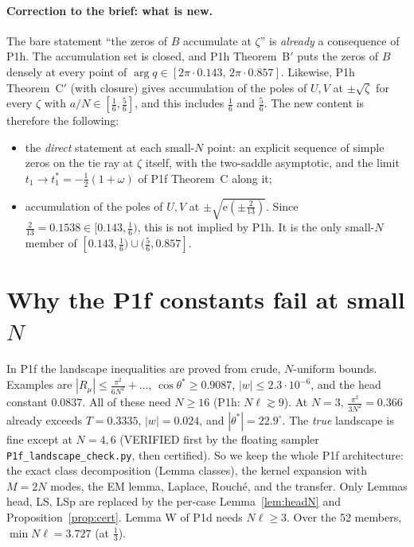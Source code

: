 \documentclass[11pt]{article}
\theoremstyle{remark}\newtheorem{remark}[theorem]{Remark}
\newcommand{\e}{\mathrm{e}}
\begin{document}
\paragraph{Correction to the brief: what is new.}
The bare statement ``the zeros of $B$ accumulate at $\zeta$'' is \emph{already} a consequence of P1h. The accumulation set is closed, and P1h Theorem~B$'$ puts the zeros of $B$ densely at every point of $\arg q\in[2\pi\cdot0.143,\,2\pi\cdot0.857]$. Likewise, P1h Theorem~C$'$ (with closure) gives accumulation of the poles of $U,V$ at $\pm\sqrt\zeta$ for every $\zeta$ with $a/N\in[\frac16,\frac56]$, and this includes $\frac16$ and $\frac56$.
The new content is therefore the following:
\begin{itemize}
\item[(i)] the \emph{direct} statement at each small-$N$ point: an explicit sequence of simple zeros on the tie ray at $\zeta$ itself, with the two-saddle asymptotic, and the limit $t_1\to t_1^*=-\frac12(1+\omega)$ of P1f Theorem~C along it;
\item[(ii)] accumulation of the poles of $U,V$ at $\pm\sqrt{\e(\pm\frac2{13})}$. Since $\frac2{13}=0.1538\in[0.143,\frac16)$, this is not implied by P1h. It is the only small-$N$ member of $[0.143,\frac16)\cup(\frac56,0.857]$.
\end{itemize}

\section{Why the P1f constants fail at small $N$}
In P1f the landscape inequalities are proved from crude, $N$-uniform bounds. Examples are $|R_\mu|\le\frac{\pi^2}{6N^2}+\dots$, $\cos\theta^*\ge0.9087$, $|w|\le2.3\cdot10^{-6}$, and the head constant $0.0837$. All of these need $N\ge16$ (P1h: $N\ell\gtrsim9$). At $N=3$, $\frac{\pi^2}{3N^2}=0.366$ already exceeds $T=0.3335$, $|w|=0.024$, and $|\theta^*|=22.9^\circ$.
The \emph{true} landscape is fine except at $N=4,6$ (VERIFIED first by the floating sampler \texttt{P1f\_landscape\_check.py}, then certified).
So we keep the whole P1f architecture: the exact class decomposition (Lemma classes), the kernel expansion with $M=2N$ modes, the EM lemma, Laplace, Rouch\'e, and the transfer. Only Lemmas head, LS, LSp are replaced by the per-case Lemma~\ref{lem:headN} and Proposition~\ref{prop:cert}.
Lemma W of P1d needs $N\ell\ge3$. Over the 52 members, $\min N\ell=3.727$ (at $\frac13$).
\end{document}
